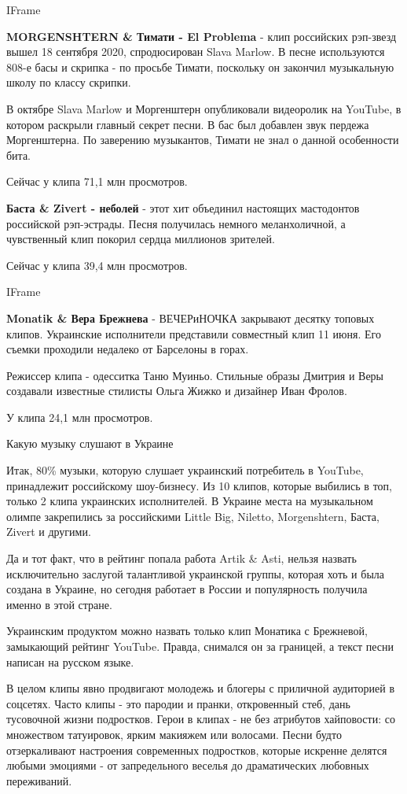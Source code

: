 IFrame

\textbf{MORGENSHTERN \& Тимати - El Problema} - клип российских рэп-звезд вышел 18
сентября 2020, спродюсирован Slava Marlow. В песне используются 808-е басы
и скрипка - по просьбе Тимати, поскольку он закончил музыкальную школу по
классу скрипки.

В октябре Slava Marlow и Моргенштерн опубликовали видеоролик на YouTube, в
котором раскрыли главный секрет песни. В бас был добавлен звук пердежа
Моргенштерна. По заверению музыкантов, Тимати не знал о данной особенности
бита. 

Сейчас у клипа 71,1 млн просмотров. 

\textbf{Баста \& Zivert - неболей} - этот хит объединил настоящих мастодонтов
российской рэп-эстрады. Песня получилась немного меланхоличной, а
чувственный клип покорил сердца миллионов зрителей. 

Сейчас у клипа 39,4 млн просмотров. 

IFrame

\textbf{Monatik \& Вера Брежнева} - ВЕЧЕРиНОЧКА закрывают десятку топовых клипов.
Украинские исполнители представили совместный клип 11 июня. Его съемки
проходили недалеко от Барселоны в горах. 

Режиссер клипа - одесситка Таню Муиньо. Стильные образы Дмитрия и Веры
создавали известные стилисты Ольга Жижко и дизайнер Иван Фролов.

У клипа 24,1 млн просмотров. 

Какую музыку слушают в Украине 

Итак, 80\% музыки, которую слушает украинский потребитель в YouTube,
принадлежит российскому шоу-бизнесу. Из 10 клипов, которые выбились в топ,
только 2 клипа украинских исполнителей. В Украине места на музыкальном
олимпе закрепились за российскими Little
Big, Niletto, Morgenshtern, Баста, Zivert и другими.

Да и тот факт, что в рейтинг попала работа Artik \& Asti, нельзя назвать
исключительно заслугой талантливой украинской группы, которая хоть и была
создана в Украине, но сегодня работает в России и популярность получила
именно в этой стране.

Украинским продуктом можно назвать только клип Монатика с Брежневой,
замыкающий рейтинг YouTube. Правда, снимался он за границей, а текст песни
написан на русском языке.

В целом клипы явно продвигают молодежь и блогеры с приличной аудиторией в
соцсетях. Часто клипы - это пародии и пранки, откровенный стеб, дань
тусовочной жизни подростков. Герои в клипах - не без атрибутов хайповости:
со множеством татуировок, ярким макияжем или волосами. Песни будто
отзеркаливают настроения современных подростков, которые искренне делятся
любыми эмоциями - от запредельного веселья до драматических любовных
переживаний. 

